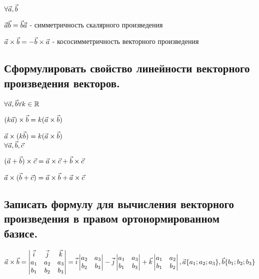 \begin{center}
$\forall \vec{a}, \vec{b}$

$\vec{a}\vec{b} = \vec{b}\vec{a}$ - симметричность скалярного произведения

$\vec{a} \times \vec{b} = - \vec{b} \times \vec{a}$ - кососимметричность векторного произведения
\end{center}

\subsection{Сформулировать свойство линейности векторного произведения векторов.}

\begin{center}
    $\forall \vec{a}, \vec{b} \forall k \in \mathbb{R}$
    
    $(k\vec{a}) \times \vec{b} = k(\vec{a} \times \vec{b})$
    
    $\vec{a} \times (k\vec{b}) = k(\vec{a} \times \vec{b})$\\
    
    $\forall \vec{a}, \vec{b}, \vec{c}$
    
    $(\vec{a} + \vec{b}) \times \vec{c} = \vec{a} \times \vec{c} + \vec{b} \times \vec{c}$
    
    $\vec{a} \times (\vec{b} + \vec{c}) = \vec{a} \times \vec{b} + \vec{a} \times \vec{c}$
\end{center}

\subsection{Записать формулу для вычисления векторного произведения в правом ортонормированном базисе.}

\begin{center}
$\vec{a} \times \vec{b} = 
\begin{vmatrix}
    \vec{i}&\vec{j}&\vec{k}\\
    a_1 & a_2 & a_3\\
    b_1 & b_2 & b_3
\end{vmatrix} = \vec{i}
\begin{vmatrix}
    a_2 & a_3\\
    b_2 & b_3
\end{vmatrix} - \vec{j}
\begin{vmatrix}
    a_1 & a_3\\
    b_1 & b_3
\end{vmatrix} + \vec{k}
\begin{vmatrix}
    a_1 & a_2\\
    b_1 & b_2
\end{vmatrix}, \vec{a}\{a_1;a_2;a_3\},\vec{b}\{b_1;b_2;b_3\}$
\end{center}

